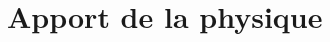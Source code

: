 \documentclass[main.tex]{subfiles}
\begin{document}
\section{Apport de la physique}



\newpage
\end{document}
